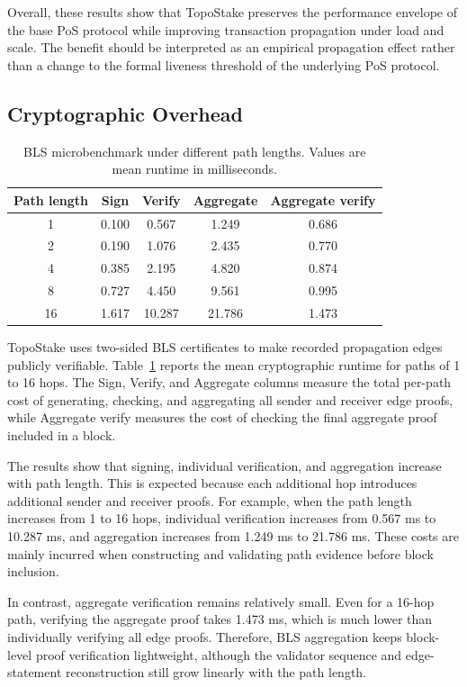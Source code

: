 \documentclass[lettersize,journal]{IEEEtran}
\begin{document}
Overall, these results show that TopoStake preserves the performance envelope of the base PoS protocol while improving transaction propagation under load and scale. The benefit should be interpreted as an empirical propagation effect rather than a change to the formal liveness threshold of the underlying PoS protocol.

\subsection{Cryptographic Overhead}
\label{subsec:eval_crypto}

\begin{table}[t]
\centering
\caption{BLS microbenchmark under different path lengths. Values are mean runtime in milliseconds.}
\label{tab:crypto_overhead}
\begin{tabular}{c|c|c|c|c}
\hline
Path length & Sign & Verify & Aggregate & Aggregate verify \\
\hline
1  & 0.100 & 0.567  & 1.249  & 0.686 \\
2  & 0.190 & 1.076  & 2.435  & 0.770 \\
4  & 0.385 & 2.195  & 4.820  & 0.874 \\
8  & 0.727 & 4.450  & 9.561  & 0.995 \\
16 & 1.617 & 10.287 & 21.786 & 1.473 \\
\hline
\end{tabular}
\end{table}

TopoStake uses two-sided BLS certificates to make recorded propagation edges publicly verifiable. 
Table~\ref{tab:crypto_overhead} reports the mean cryptographic runtime for paths of 1 to 16 hops. 
The Sign, Verify, and Aggregate columns measure the total per-path cost of generating, checking, and aggregating all sender and receiver edge proofs, while Aggregate verify measures the cost of checking the final aggregate proof included in a block.

The results show that signing, individual verification, and aggregation increase with path length. 
This is expected because each additional hop introduces additional sender and receiver proofs. 
For example, when the path length increases from 1 to 16 hops, individual verification increases from 0.567 ms to 10.287 ms, and aggregation increases from 1.249 ms to 21.786 ms. 
These costs are mainly incurred when constructing and validating path evidence before block inclusion.

In contrast, aggregate verification remains relatively small. 
Even for a 16-hop path, verifying the aggregate proof takes 1.473 ms, which is much lower than individually verifying all edge proofs. 
Therefore, BLS aggregation keeps block-level proof verification lightweight, although the validator sequence and edge-statement reconstruction still grow linearly with the path length.
\end{document}
